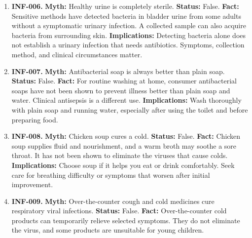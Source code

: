 \documentclass[11pt,oneside]{book}
\begin{document}
\begin{enumerate}[leftmargin=0pt,labelwidth=0pt,labelsep=0pt,itemindent=0pt]
\textbf{Fact:} Drinking urine has no established therapeutic benefit. Urine contains substances the kidneys are excreting, and its composition varies with hydration, illness, and medicines. \cite{ref393}\newline
\textbf{Implications:} Use safe drinking water for hydration and seek appropriate treatment for the condition of concern.
\item[] \textbf{INF-006.} \textbf{Myth:} Healthy urine is completely sterile.\newline
\textbf{Status:} False.\newline
\textbf{Fact:} Sensitive methods have detected bacteria in bladder urine from some adults without a symptomatic urinary infection. A collected sample can also acquire bacteria from surrounding skin. \cite{ref282}\newline
\textbf{Implications:} Detecting bacteria alone does not establish a urinary infection that needs antibiotics. Symptoms, collection method, and clinical circumstances matter.
\item[] \textbf{INF-007.} \textbf{Myth:} Antibacterial soap is always better than plain soap.\newline
\textbf{Status:} False.\newline
\textbf{Fact:} For routine washing at home, consumer antibacterial soaps have not been shown to prevent illness better than plain soap and water. Clinical antisepsis is a different use. \cite{ref394}\newline
\textbf{Implications:} Wash thoroughly with plain soap and running water, especially after using the toilet and before preparing food.
\item[] \textbf{INF-008.} \textbf{Myth:} Chicken soup cures a cold.\newline
\textbf{Status:} False.\newline
\textbf{Fact:} Chicken soup supplies fluid and nourishment, and a warm broth may soothe a sore throat. It has not been shown to eliminate the viruses that cause colds. \cite{ref391}\newline
\textbf{Implications:} Choose soup if it helps you eat or drink comfortably. Seek care for breathing difficulty or symptoms that worsen after initial improvement.
\item[] \textbf{INF-009.} \textbf{Myth:} Over-the-counter cough and cold medicines cure respiratory viral infections.\newline
\textbf{Status:} False.\newline
\textbf{Fact:} Over-the-counter cold products can temporarily relieve selected symptoms. They do not eliminate the virus, and some products are unsuitable for young children. \cite{ref391,ref43}\newline

\end{enumerate}
\end{document}
